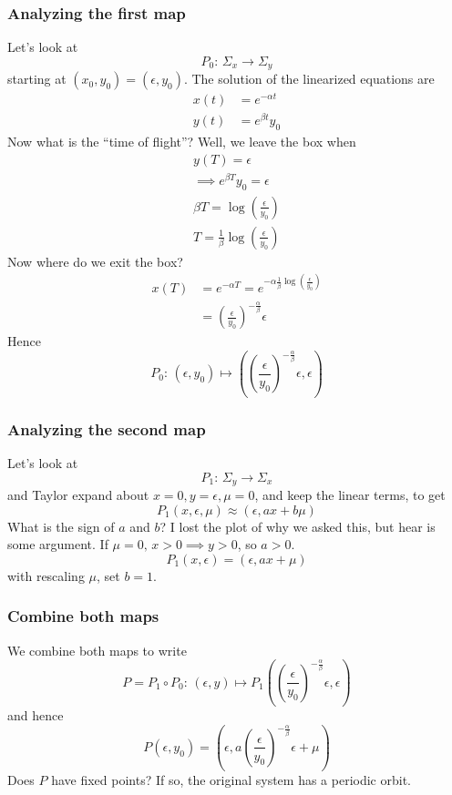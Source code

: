 \documentclass{article}
\begin{document}
\subsubsection{Analyzing the first map}
Let's look at 
\[
P_0:\, \Sigma_x \to \Sigma_y
\]
starting at $(x_0,y_0)=(\epsilon, y_0)$. The solution of the linearized equations are 
\begin{align*}
    x(t) &= e^{-\alpha t}\\
    y(t) &= e^{\beta t}y_0
\end{align*}
Now what is the ``time of flight''? Well, we leave the box when
\begin{gather*}
    y(T)=\epsilon\\
    \implies e^{\beta T}y_0=\epsilon\\
    \beta T = \log \left( \frac{\epsilon}{y_0} \right)\\
    T = \frac{1}{\beta} \log \left( \frac{\epsilon}{y_0} \right)
\end{gather*}
Now where do we exit the box? 
\begin{align*}
    x(T) &= e^{-\alpha T}=e^{-\alpha\frac{1}{\beta} \log \left( \frac{\epsilon}{y_0} \right)}\\
    &=\left(\frac{\epsilon}{y_0}\right)^{-\frac{\alpha}{\beta}}\epsilon
\end{align*}
Hence 
\[
P_0:\, (\epsilon, y_0)\mapsto \left(\left(\frac{\epsilon}{y_0}\right)^{-\frac{\alpha}{\beta}}\epsilon, \epsilon\right)
\]

\subsubsection{Analyzing the second map}

Let's look at 
\[
P_1:\, \Sigma_y \to \Sigma_x
\]
and Taylor expand about $x=0,y=\epsilon,\mu=0$, and keep the linear terms, to get 
\[
P_1(x,\epsilon,\mu) \approx (\epsilon, ax+b\mu)
\]
What is the sign of $a$ and $b$? I lost the plot of why we asked this, but hear is some argument. If $\mu=0,\,x>0\implies y>0$, so $a>0$.
\[
P_1(x,\epsilon) = (\epsilon, ax+\mu)
\]
with rescaling $\mu$, set $b=1$.

\subsubsection{Combine both maps}

We combine both maps to write 
\[
P = P_1\circ P_0:\, (\epsilon, y) \mapsto P_1\left(\left(\frac{\epsilon}{y_0}\right)^{-\frac{\alpha}{\beta}}\epsilon, \epsilon\right)
\]
and hence 
\[
P(\epsilon, y_0) = \left(\epsilon, a\left(\frac{\epsilon}{y_0}\right)^{-\frac{\alpha}{\beta}}\epsilon + \mu\right)
\]
Does $P$ have fixed points? If so, the original system has a periodic orbit. 
\end{document}

